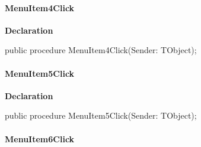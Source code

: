 \documentclass{report}
\newif\ifpdf
\begin{document}
\paragraph*{MenuItem4Click}\hspace*{\fill}

\label{prjwizard.TfrmProjectWizard-MenuItem4Click}
\begin{list}{}{
\setlength{\itemindent}{0cm}
\setlength{\listparindent}{0cm}
\setlength{\leftmargin}{\evensidemargin}
\addtolength{\leftmargin}{\tmplength}
\settowidth{\labelsep}{X}
\addtolength{\leftmargin}{\labelsep}
\setlength{\labelwidth}{\tmplength}
}
\item[\textbf{Declaration}\hfill]
\ifpdf
\begin{flushleft}
\fi
\begin{ttfamily}
public procedure MenuItem4Click(Sender: TObject);\end{ttfamily}

\ifpdf
\end{flushleft}
\fi

\end{list}
\paragraph*{MenuItem5Click}\hspace*{\fill}

\label{prjwizard.TfrmProjectWizard-MenuItem5Click}
\begin{list}{}{
\setlength{\itemindent}{0cm}
\setlength{\listparindent}{0cm}
\setlength{\leftmargin}{\evensidemargin}
\addtolength{\leftmargin}{\tmplength}
\settowidth{\labelsep}{X}
\addtolength{\leftmargin}{\labelsep}
\setlength{\labelwidth}{\tmplength}
}
\item[\textbf{Declaration}\hfill]
\ifpdf
\begin{flushleft}
\fi
\begin{ttfamily}
public procedure MenuItem5Click(Sender: TObject);\end{ttfamily}

\ifpdf
\end{flushleft}
\fi

\end{list}
\paragraph*{MenuItem6Click}\hspace*{\fill}
\end{document}
